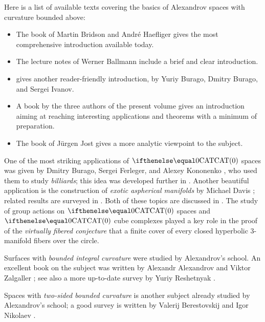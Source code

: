 Here is a list of available texts covering the basics of Alexandrov spaces with curvature bounded above: 
\begin{itemize}
\item The book of Martin Bridson and Andr\'e Haefliger \cite{bridson-haefliger} gives the most comprehensive introduction available today. 
\item The lecture notes of Werner Ballmann \cite{ballmann:lectures, ballmann:notes} include a brief 
and clear
introduction.
\item \cite[Chapter 9]{burago-burago-ivanov} gives another reader-friendly introduction, by Yuriy Burago, Dmitry Burago, and Sergei Ivanov.
\item A book  by the three authors of the present volume  \cite{alexander-kapovitch-petrunin-CAT} gives an introduction aiming at reaching interesting applications and theorems with a minimum of preparation.
\item The book of Jürgen Jost \cite{jost:book} gives a more analytic viewpoint to the subject.
\end{itemize}

One of the most striking applications of $\CAT0$ spaces was given by Dmitry Burago, Sergei Ferleger, and Alexey Kononenko \cite{burago-ferleger-kononenko1998-1},
who used them to study {}\emph{billiards}; this idea was developed further in \cite{burago-ferleger-kononenko1998-2,burago-ferleger-kononenko1998-3,burago-ferleger-kononenko1998-4,burago-ferleger-kononenko2000,burago-ferleger-kononenko2001}. 
Another beautiful application is the construction of {}\emph{exotic aspherical manifolds} by Michael Davis \cite{davis:aspherical}; related results are surveyed in \cite{davis:exotic,charney-davis-1995}.
Both of these topics are discussed in \cite{alexander-kapovitch-petrunin-CAT}.
The study of group actions on $\CAT 0$ spaces and $\CAT 0$ cube complexes played a key role in the proof of the {}\emph{virtually fibered conjecture} that a finite cover of  every closed hyperbolic 3-manifold fibers over the circle.

Surfaces with {}\emph{bounded integral curvature} were studied by Alexandrov's school.
An excellent book on the subject was written by Alexandr Alexandrov and Viktor Zalgaller \cite{aleksandrov-zalgaller}; see also a more up-to-date survey by Yuriy Reshetnyak \cite{reshetnyak:2D}.

Spaces with {}\emph{two-sided bounded curvature} is another subject already studied  by Alexandrov's school;
a good survey is written by Valerij Berestovskij and Igor Nikolaev \cite{berestovskii-nikolaev}.

